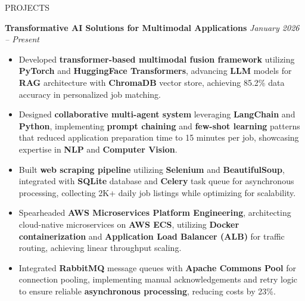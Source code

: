 \documentclass{resume}
\begin{document}
\begin{rSection}{PROJECTS}
    \setlength{\parskip}{1pt}
    \setlength{\baselineskip}{1pt}

    \textbf{Transformative AI Solutions for Multimodal Applications} \hfill \textit{January 2026 – Present}
    \vspace{-3pt}
\begin{itemize}
    \item Developed \textbf{transformer-based multimodal fusion framework} utilizing \textbf{PyTorch} and \textbf{HuggingFace Transformers}, advancing \textbf{LLM} models for \textbf{RAG} architecture with \textbf{ChromaDB} vector store, achieving 85.2\% data accuracy in personalized job matching.
    
    \item Designed \textbf{collaborative multi-agent system} leveraging \textbf{LangChain} and \textbf{Python}, implementing \textbf{prompt chaining} and \textbf{few-shot learning} patterns that reduced application preparation time to 15 minutes per job, showcasing expertise in \textbf{NLP} and \textbf{Computer Vision}.
    
    \item Built \textbf{web scraping pipeline} utilizing \textbf{Selenium} and \textbf{BeautifulSoup}, integrated with \textbf{SQLite} database and \textbf{Celery} task queue for asynchronous processing, collecting 2K+ daily job listings while optimizing for scalability.
\end{itemize}
\begin{itemize}
    \item Spearheaded \textbf{AWS Microservices Platform Engineering}, architecting cloud-native microservices on \textbf{AWS ECS}, utilizing \textbf{Docker containerization} and \textbf{Application Load Balancer (ALB)} for traffic routing, achieving linear throughput scaling.
    
    \item Integrated \textbf{RabbitMQ} message queues with \textbf{Apache Commons Pool} for connection pooling, implementing manual acknowledgements and retry logic to ensure reliable \textbf{asynchronous processing}, reducing costs by 23\%.
\end{itemize}



\end{rSection} 
\vspace{-18pt}
% 

\end{document}
